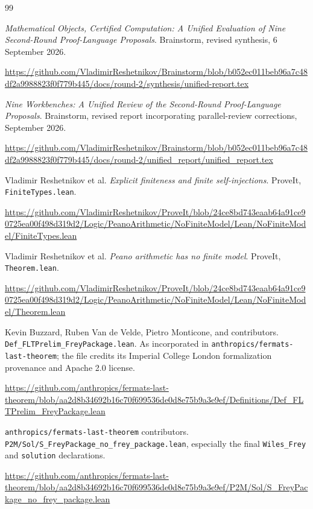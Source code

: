 \documentclass[11pt,letterpaper]{article}
\newcommand{\code}[1]{\nolinkurl{#1}}
\theoremstyle{remark}
\begin{document}
\clearpage
\begin{thebibliography}{99}
\small

\emph{Mathematical Objects, Certified Computation: A Unified Evaluation of
Nine Second-Round Proof-Language Proposals}. Brainstorm, revised synthesis,
6 September 2026.\par
\url{https://github.com/VladimirReshetnikov/Brainstorm/blob/b052ec011beb96a7c48df2a9988823f0f779b445/docs/round-2/synthesis/unified-report.tex}

\emph{Nine Workbenches: A Unified Review of the Second-Round Proof-Language
Proposals}. Brainstorm, revised report incorporating parallel-review
corrections, September 2026.\par
\url{https://github.com/VladimirReshetnikov/Brainstorm/blob/b052ec011beb96a7c48df2a9988823f0f779b445/docs/round-2/unified_report/unified_report.tex}

Vladimir Reshetnikov et al. \emph{Explicit finiteness and finite self-injections}.
ProveIt, \code{FiniteTypes.lean}.\par
\url{https://github.com/VladimirReshetnikov/ProveIt/blob/24ce8bd743eaab64a91ce90725ea00f498d319d2/Logic/PeanoArithmetic/NoFiniteModel/Lean/NoFiniteModel/FiniteTypes.lean}

Vladimir Reshetnikov et al. \emph{Peano arithmetic has no finite model}.
ProveIt, \code{Theorem.lean}.\par
\url{https://github.com/VladimirReshetnikov/ProveIt/blob/24ce8bd743eaab64a91ce90725ea00f498d319d2/Logic/PeanoArithmetic/NoFiniteModel/Lean/NoFiniteModel/Theorem.lean}

Kevin Buzzard, Ruben Van de Velde, Pietro Monticone, and contributors.
\code{Def_FLTPrelim_FreyPackage.lean}. As incorporated in
\code{anthropics/fermats-last-theorem}; the file credits its Imperial College
London formalization provenance and Apache 2.0 license.\par
\url{https://github.com/anthropics/fermats-last-theorem/blob/aa2d8b34692b16c70f699536de0d8e75b9a3e9ef/Definitions/Def_FLTPrelim_FreyPackage.lean}

\code{anthropics/fermats-last-theorem} contributors.
\code{P2M/Sol/S_FreyPackage_no_frey_package.lean}, especially the final
\code{Wiles_Frey} and \code{solution} declarations.\par
\url{https://github.com/anthropics/fermats-last-theorem/blob/aa2d8b34692b16c70f699536de0d8e75b9a3e9ef/P2M/Sol/S_FreyPackage_no_frey_package.lean}


\end{thebibliography}
\end{document}
